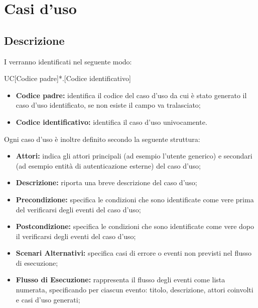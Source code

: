 \documentclass[../AnalisideiRequisiti.tex]{subfiles}
\begin{document}

	\chapter{Casi d'uso}
	\section{Descrizione}
	I  verranno identificati nel seguente modo: 
	
	\begin{center}
		UC[Codice padre]*.[Codice identificativo]
	\end{center}
	
	\begin{itemize}
		\item \textbf{Codice padre:} identifica il codice del caso d'uso da cui è stato generato il caso d'uso identificato, se non esiste il campo va tralasciato;
		\item \textbf{Codice identificativo:} identifica il caso d'uso univocamente.
	\end{itemize}
	
	\noindent Ogni caso d'uso è inoltre definito secondo la seguente struttura:
	\begin{itemize}
		\item \textbf{Attori:} indica gli attori principali (ad esempio l'utente generico) e secondari (ad esempio entità di autenticazione esterne) del caso d'uso;
		\item \textbf{Descrizione:} riporta una breve descrizione del caso d'uso;
		\item \textbf{Precondizione:} specifica le condizioni che sono identificate come vere prima del verificarsi degli eventi del caso d'uso;
		\item \textbf{Postcondizione:} specifica le condizioni che sono identificate come vere dopo il verificarsi degli eventi del caso d'uso;

		\item \textbf{Scenari Alternativi:} specifica casi di errore o eventi non previsti nel flusso di esecuzione;
		\item \textbf{Flusso di Esecuzione:} rappresenta il flusso degli eventi come lista numerata, specificando per ciascun evento: titolo, descrizione, attori coinvolti e casi d'uso generati;
	\end{itemize}
\end{document}
